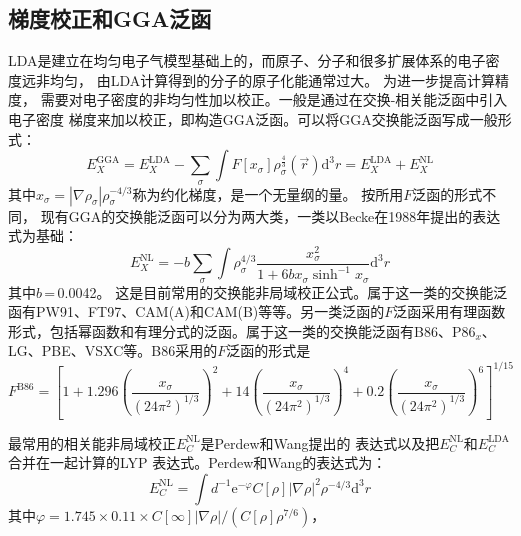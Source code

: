 \subsection{梯度校正和GGA泛函}
LDA是建立在均匀电子气模型基础上{的}，而原子、分子和很多扩展体系的电子密度远非均匀，%
由LDA计算得到的分子的原子化能{通常}过大。%
{为}进一步提高计算精度，%
需要对电子密度的非均匀性加以校正。一般是通过在交换-相关能泛函中引入电子密度%
梯度来加以校正{，}即构造GGA泛函。可以将GGA交换能泛函写成一般形式：
\begin{equation}
	E_X^{\mathrm{GGA}}=E_X^{\mathrm{\mathrm{LDA}}}-\sum_{\sigma}\int F[x_{\sigma}]\rho_{\sigma}^{\frac43}(\vec r)\textrm{d}^3r{=E_X^{\mathrm{LDA}}+E_X^{\mathrm{NL}}}
  \label{eq:dft-18}
\end{equation}
其中$x_{\sigma}=|\nabla\rho_{\sigma}|\rho_{\sigma}^{-4/3}$称为约化梯度，是一个无量纲的量。%
{按}所用$F${泛函}的形式不同，%
{现有}GGA的交换能泛函可以分为两大类，一类以Becke\cite{PRA38-3098_1988}在1988年提出的表达式为基础：
\begin{equation}
  \label{eq:dft-9}
  E_X^{\mathrm{NL}}=-b\sum_{\sigma}\int\rho_{\sigma}^{4/3}\dfrac{x_{\sigma}^2}{1+6bx_{\sigma}\sinh^{-1}x_{\sigma}}\textrm{d}^3r
\end{equation}
其中$b$\,=\,0.0042{。}%
这是目前常用的交换能非局域校正公式。属于这一类的交换能泛函有PW91\cite{PRB46-6671_1992,PRB48-4978_1993,PRB54-16533_1996,PRB57-14999_1998}、FT97\cite{MP91-847_1997}、CAM(A)和CAM(B)\cite{JCP99-8765_1993}等等。另一类泛函的$F${泛函}采用有理函数{形式，}包括幂函数和有理分式的泛函。属于这一类的交换能泛函有B86\cite{JCP84-4524_1986}、P86$_x$\cite{PRB33-8800_1986}、LG\cite{PRA47-4681_1993}、PBE\cite{PRL77-1396_1996,IBID78-1396_1997}、VSXC\cite{JCP109-400_1998}等。B86采用的$F${泛函}的形式是
\begin{equation}
	F^{\mathrm{B86}}=\left[1+1.296\left(\dfrac{x_{\sigma}}{(24\pi^2)^{1/3}}\right)^2+14\left(\dfrac{x_{\sigma}}{(24\pi^2)^{1/3}}\right)^4+0.2\left(\dfrac{x_{\sigma}}{(24\pi^2)^{1/3}}\right)^6\right]^{1/15}
  \label{eq:dft-19}
\end{equation}

最常用的相关能非局域校正{$E_C^{\mathrm{NL}}$}是Perdew和Wang\cite{PRB33-8822_1986}提出的%
{表达}式以及把$E_C^{\mathrm{NL}}$和$E_C^{\mathrm{LDA}}$合{并}在一起计算的LYP%
{表达}式\cite{PRB37-785_1988}。Perdew和Wang的表达式为：
\begin{equation} 
  \label{eq:dft-10}
  E_C^{\mathrm{NL}}=\int{d^{-1}\textrm{e}^{-\varphi}C[\rho]|\nabla\rho|^2\rho^{-4/3}\textrm{d}^3r}
\end{equation}
其中$\varphi=1.745\times 0.11\times C[\infty]|\nabla\rho|/(C[\rho]\rho^{7/6})$，%

